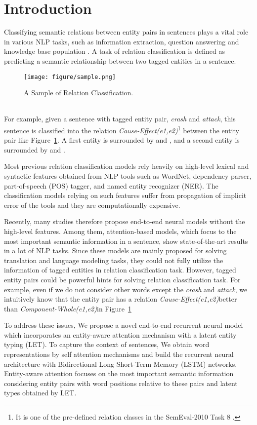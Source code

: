 \documentclass[twoside,leqno,twocolumn]{article}
\begin{document}
\section{Introduction}
Classifying semantic relations between entity pairs in sentences plays a vital role in various NLP tasks, such as information extraction, question answering and knowledge base population \cite{nguyen2015relation}. 
A task of relation classification is defined as predicting a semantic relationship between two tagged entities in a sentence.
\begin{figure}[!ht]
\texttt{[image: figure/sample.png]}
\caption{A Sample of Relation Classification.}
\label{fig:sample}
\end{figure}\\
For example, given a sentence with tagged entity pair, \textit{crash} and \textit{attack}, this sentence is classified into the relation \textit{Cause-Effect(e1,e2)}\footnote[1]{It is one of the pre-defined relation classes in the SemEval-2010 Task 8 \cite{hendrickx2009semeval}.} between the entity pair like Figure~\ref{fig:sample}.
A first entity is surrounded by  and , and a second entity is surrounded by  and .

Most previous relation classification models rely heavily on high-level lexical and syntactic features obtained from NLP tools such as WordNet, dependency parser, part-of-speech (POS) tagger, and named entity recognizer (NER).
The classification models relying on such features suffer from propagation of implicit error of the tools and they are computationally expensive.

Recently, many studies therefore propose end-to-end neural models without the high-level features.
Among them, attention-based models, which focus to the most important semantic information in a sentence, show state-of-the-art results in a lot of NLP tasks.
Since these models are mainly proposed for solving translation and language modeling tasks, they could not fully utilize the information of tagged entities in relation classification task.
However, tagged entity pairs could be powerful hints for solving relation classification task.
For example, even if we do not consider other words except the \textit{crash} and \textit{attack}, we intuitively know that the entity pair has a relation \textit{Cause-Effect(e1,e2)}\footnotemark[1] better than \textit{Component-Whole(e1,e2)}\footnotemark[1] in Figure~\ref{fig:sample}

To address these issues, We propose a novel end-to-end recurrent neural model which incorporates an entity-aware attention mechanism with a latent entity typing (LET).
To capture the context of sentences, We obtain word representations by self attention mechanisms and build the recurrent neural architecture with Bidirectional Long Short-Term Memory (LSTM) networks.
Entity-aware attention focuses on the most important semantic information considering entity pairs with word positions relative to these pairs and latent types obtained by LET.
\end{document}
